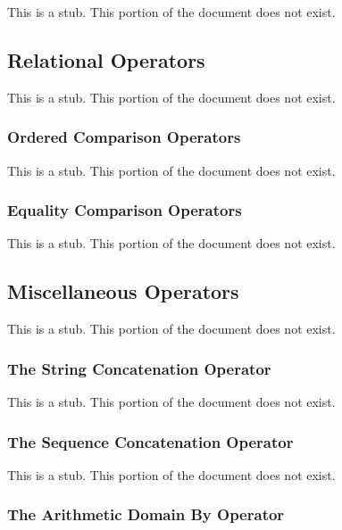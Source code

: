This is a stub.  This portion of the document does not exist.

\subsection{Relational Operators}
\label{Relational_Operators}

This is a stub.  This portion of the document does not exist.

\subsubsection{Ordered Comparison Operators}
\label{Ordered_Comparison_Operators}

This is a stub.  This portion of the document does not exist.

\subsubsection{Equality Comparison Operators}
\label{Equality_Comparison_Operators}

This is a stub.  This portion of the document does not exist.

\subsection{Miscellaneous Operators}
\label{Miscellaneous_Operators}

This is a stub.  This portion of the document does not exist.

\subsubsection{The String Concatenation Operator}
\label{The_String_Concatenation_Operator}

This is a stub.  This portion of the document does not exist.

\subsubsection{The Sequence Concatenation Operator}
\label{The_Sequence_Concatenation_Operator}

This is a stub.  This portion of the document does not exist.

\subsubsection{The Arithmetic Domain By Operator}
\label{The_Arithmetic_Domain_By_Operator}

